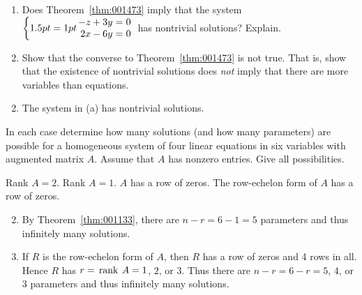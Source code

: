 \begin{multicols}{2}
\begin{ex} %
\begin{enumerate}[label={\alph*.}]
\item Does Theorem~\ref{thm:001473} imply that the system 
$\left \{
\arraycolsep=1pt
\begin{array}{rcl}
	-z + 3y & = & 0 \\
	2x - 6y & = & 0
\end{array}
\right.$ has nontrivial solutions? Explain.

\item Show that the converse to Theorem~\ref{thm:001473} is not true. That is, show that the existence of nontrivial solutions does \textit{not} imply that there are more variables than equations.

\end{enumerate}
\begin{sol}
\begin{enumerate}[label={\alph*.}]
\setcounter{enumi}{1}
\item  The system in (a) has nontrivial solutions.

\end{enumerate}
\end{sol}
\end{ex}

\begin{ex} %
In each case determine how many solutions (and how many parameters) are possible for a homogeneous system of four linear equations in six variables with augmented matrix $A$. Assume that $A$ has nonzero entries. Give all possibilities.

\begin{exenumerate}
\exitem Rank $A = 2$.
\exitem Rank $A = 1$.
\exitem* $A$ has a row of zeros.
\exitem* The row-echelon form of $A$ has a row of zeros.
\end{exenumerate}
\begin{sol}
\begin{enumerate}[label={\alph*.}]
\setcounter{enumi}{1}
\item  By Theorem~\ref{thm:001133}, there are $n - r = 6 - 1 = 5$ parameters and thus infinitely many solutions.

\setcounter{enumi}{3}
\item  If $R$ is the row-echelon form of $A$, then $R$ has a row of zeros and 4 rows in all. Hence $R$ has $r = \thinspace\operatorname{rank \medspace} A = 1$, $2$, or $3$. Thus there are $n - r = 6 - r = 5$, $4$, or $3$ parameters and thus infinitely many solutions.


\end{enumerate}
\end{sol}
\end{ex}
\end{multicols}
